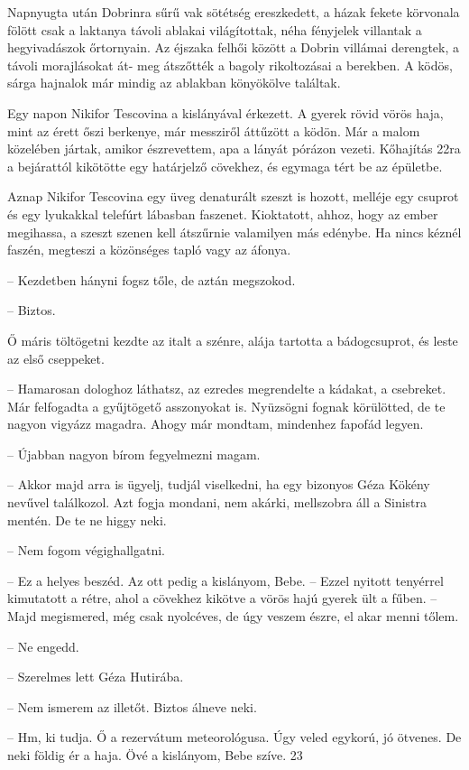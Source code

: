\documentclass{IEEEtran}
\begin{document}
Napnyugta után Dobrinra sűrű vak sötétség ereszkedett, a házak fekete
körvonala fölött csak a laktanya távoli ablakai világítottak, néha fényjelek
villantak a hegyivadászok őrtornyain. Az éjszaka felhői között a Dobrin
villámai derengtek, a távoli morajlásokat át- meg átszőtték a bagoly
rikoltozásai a berekben. A ködös, sárga hajnalok már mindig az ablakban
könyökölve találtak.

Egy napon Nikifor Tescovina a kislányával érkezett. A gyerek rövid vörös haja,
mint az érett őszi berkenye, már messziről áttűzött a ködön. Már a malom
közelében jártak, amikor észrevettem, apa a lányát pórázon vezeti. Kőhajítás
22ra a bejárattól kikötötte egy határjelző cövekhez, és egymaga tért be az
épületbe.

Aznap Nikifor Tescovina egy üveg denaturált szeszt is hozott, melléje egy
csuprot és egy lyukakkal telefúrt lábasban faszenet. Kioktatott, ahhoz, hogy
az ember megihassa, a szeszt szenen kell átszűrnie valamilyen más edénybe. Ha
nincs kéznél faszén, megteszi a közönséges tapló vagy az áfonya.

– Kezdetben hányni fogsz tőle, de aztán megszokod.

– Biztos.

Ő máris töltögetni kezdte az italt a szénre, alája tartotta a bádogcsuprot, és
leste az első cseppeket.

– Hamarosan dologhoz láthatsz, az ezredes megrendelte a kádakat, a csebreket.
Már felfogadta a gyűjtögető asszonyokat is. Nyüzsögni fognak körülötted, de te
nagyon vigyázz magadra. Ahogy már mondtam, mindenhez fapofád legyen.

– Újabban nagyon bírom fegyelmezni magam.

– Akkor majd arra is ügyelj, tudjál viselkedni, ha egy bizonyos Géza Kökény
nevűvel találkozol. Azt fogja mondani, nem akárki, mellszobra áll a Sinistra
mentén. De te ne higgy neki.

– Nem fogom végighallgatni.

– Ez a helyes beszéd. Az ott pedig a kislányom, Bebe. – Ezzel nyitott
tenyérrel kimutatott a rétre, ahol a cövekhez kikötve a vörös hajú gyerek ült
a fűben. – Majd megismered, még csak nyolcéves, de úgy veszem észre, el akar
menni tőlem.

– Ne engedd.

– Szerelmes lett Géza Hutirába.

– Nem ismerem az illetőt. Biztos álneve neki.

– Hm, ki tudja. Ő a rezervátum meteorológusa. Úgy veled egykorú, jó ötvenes.
De neki földig ér a haja. Övé a kislányom, Bebe szíve.
23
\end{document}
